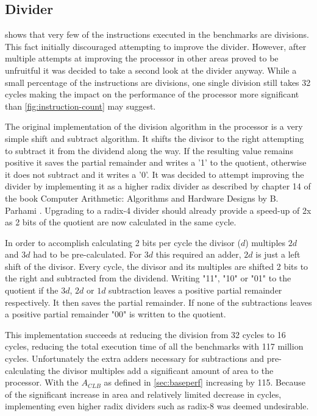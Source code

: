\documentclass[final]{article}
\begin{document}
\subsection{Divider}
 shows that very few of the instructions executed in the benchmarks are divisions. This fact initially discouraged attempting to improve the divider. However, after multiple attempts at improving the processor in other areas proved to be unfruitful it was decided to take a second look at the divider anyway. While a small percentage of the instructions are divisions, one single division still takes 32 cycles making the impact on the performance of the processor more significant than \cref{fig:instruction-count} may suggest. 

The original implementation of the division algorithm in the processor is a very simple shift and subtract algorithm. It shifts the divisor to the right attempting to subtract it from the dividend along the way. If the resulting value remains positive it saves the partial remainder and writes a '1' to the quotient, otherwise it does not subtract and it writes a '0'. It was decided to attempt improving the divider by implementing it as a higher radix divider as described by chapter 14 of the book Computer Arithmetic: Algorithms and Hardware Designs by B. Parhami \cite{parhami}. Upgrading to a radix-4 divider should already provide a speed-up of 2x as 2 bits of the quotient are now calculated in the same cycle.

In order to accomplish calculating 2 bits per cycle the divisor ($d$) multiples $2d$ and $3d$ had to be pre-calculated. For $3d$ this required an adder, $2d$ is just a left shift of the divisor. Every cycle, the divisor and its multiples are shifted 2 bits to the right and subtracted from the dividend. Writing "11", "10" or "01" to the quotient if the $3d$, $2d$ or $1d$ subtraction leaves a positive partial remainder respectively. It then saves the partial remainder. If none of the subtractions leaves a positive partial remainder "00" is written to the quotient.

This implementation succeeds at reducing the division from 32 cycles to 16 cycles, reducing the total execution time of all the benchmarks with 117 million cycles. Unfortunately the extra adders necessary for subtractions and pre-calculating the divisor multiples add a significant amount of area to the processor. With the $A_{CLB}$ as defined in \cref{sec:baseperf} increasing by 115. Because of the significant increase in area and relatively limited decrease in cycles, implementing even higher radix dividers such as radix-8 was deemed undesirable.
\end{document}
